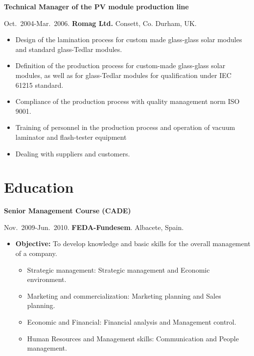 \documentclass{article}
\begin{document}

{\bf Technical Manager of the PV module production line}

\medskip
Oct.~2004-Mar.~2006. 
{\bf Romag Ltd.} 
Consett, Co. Durham, UK.

\begin{itemize}\itemsep 0pt
\item Design of the lamination process for custom made glass-glass solar modules and standard glass-Tedlar modules.
\item Definition of the production process for custom-made glass-glass solar modules, as well as for glass-Tedlar modules for qualification under IEC 61215 standard.
\item Compliance of the production process with quality management norm ISO 9001.
\item Training of personnel in the production process and operation of vacuum laminator and flash-tester equipment
\item Dealing with suppliers and customers.
\end{itemize}


\section*{Education}

{\bf Senior Management Course (CADE)}

\medskip
Nov.~2009-Jun.~2010. {\bf FEDA-Fundesem}. Albacete, Spain.

\begin{itemize}\itemsep 0pt
\item {\bf Objective:} To develop knowledge and basic skills for the overall management of a company.
\begin{itemize} 
\item Strategic management:  Strategic management and Economic environment.
\item Marketing and commercialization:  Marketing planning and Sales planning.
\item Economic and Financial:  Financial analysis and Management control.
\item Human Resources and Management skills:  Communication and  People management.
\end{itemize}
\end{itemize}
\end{document}
